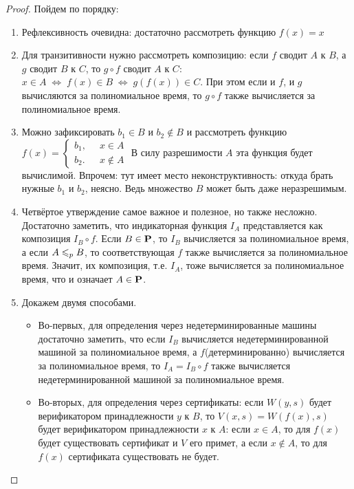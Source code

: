 \begin{proof} Пойдем по порядку:
\begin{enumerate}
    \item Рефлексивность очевидна: достаточно рассмотреть функцию $f(x)=x$
    \item  Для транзитивности нужно рассмотреть композицию: если $f$ сводит
$A$ к $B$, а $g$ сводит $B$ к $C$, то $g \circ f$ сводит $A$ к $C$: $x \in A \;\Leftrightarrow \; f(x)\in B \;\Leftrightarrow \; g(f(x)) \in C$.
При этом если и $f$, и $g$ вычисляются за полиномиальное время, то $g \circ f$ также
вычисляется за полиномиальное время.
\item Можно
зафиксировать $b_1\in B$ и $b_2 \notin B$ и рассмотреть функцию  $ f(x) =
  \begin{cases}
    b_1,    & \;\; x \in A\\
    b_2.  & \;\; x \notin A
  \end{cases}
$ \newline В силу разрешимости $A$ эта функция будет вычислимой. Впрочем: тут имеет место неконструктивность: откуда брать нужные $b_1$ и $b_2$, неясно. Ведь множество
$B$ может быть даже неразрешимым.
\item Четвёртое утверждение самое важное и полезное, но также несложно. Достаточно заметить, что индикаторная функция $I_A$ представляется как
композиция $I_B \circ f$. Если $B \in \textbf{P}$, то $I_B$ вычисляется за полиномиальное время,
а если $A \leqslant_p B$, то соответствующая $f$ также вычисляется за полиномиальное
время. Значит, их композиция, т.е. $I_A$, тоже вычисляется за полиномиальное
время, что и означает $A\in\textbf{P}$.
\item Докажем двумя способами. 
\begin{itemize}
    \item Во-первых, для
определения через недетерминированные машины достаточно заметить, что если $I_B$ вычисляется недетерминированной машиной за полиномиальное время,
а $f$(детерминированно) вычисляется за полиномиальное время, то $I_A = I_B \circ f$
также вычисляется недетерминированной машиной за полиномиальное время.
\item Во-вторых, для определения через сертификаты: если $W(y,s)$ будет верификатором принадлежности $y$ к $B$, то $V(x,s) = W(f(x),s)$ будет верификатором
принадлежности $x$ к $A$: если $x\in A$, то для $f(x)$ будет существовать сертификат и $V$ его примет, а если $x\notin A$, то для $f(x)$ сертификата существовать не
будет.
\end{itemize}


\end{enumerate}

\end{proof}

